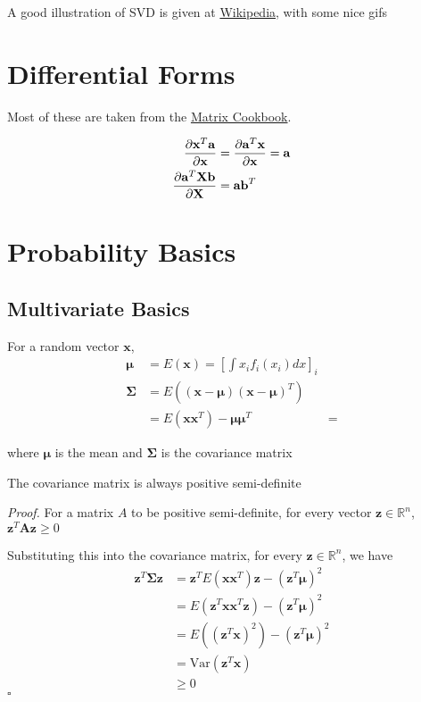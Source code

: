 \documentclass[a4paper]{article}
\newenvironment{proof}{\begin{breakbox}\textit{Proof.}}{\hfill$\square$\end{breakbox}}
\newcommand{\nl}{\vspace{0.2cm}\\}
\newcommand{\mf}{\mathbf}
\newcommand{\mb}{\mathbb}
\begin{document}
A good illustration of SVD is given at \href{https://en.wikipedia.org/wiki/Singular_value_decomposition}{Wikipedia}, with some nice gifs

\section{Differential Forms}

Most of these are taken from the \href{https://www.math.uwaterloo.ca/~hwolkowi/matrixcookbook.pdf}{Matrix Cookbook}. 

\begin{align}
  \pdv{\mf{x}^T\mf{a}}{\mf{x}} &= \pdv{\mf{a}^T\mf{x}}{\mf{x}} = \mf{a} \\
  \pdv{\mf{a}^T\mf{Xb}}{\mf{X}} &= \mf{ab}^T
\end{align}

\section{Probability Basics}

\subsection{Multivariate Basics}

For a random vector $\mf{x}$,
\begin{align}
  \bm{\mu} &= E(\bm{x}) = [\int x_i f_i(x_i) dx]_i \\
  \bm{\Sigma} &= E((\bm{x} - \bm{\mu})(\bm{x} - \bm{\mu})^T) \\
  &= E(\bm{x}\bm{x}^T) - \bm{\mu\mu}^T
  &= 
\end{align}

where $\bm{\mu}$ is the mean and $\bm{\Sigma}$ is the covariance matrix \nl

\begin{theorem}
  The covariance matrix is always positive semi-definite
\end{theorem}
\begin{proof}
  For a matrix $A$ to be positive semi-definite, for every vector $\bm{z} \in \mb{R}^n$, $\bm{z}^T\bm{Az} \ge 0$

  Substituting this into the covariance matrix, for every $\bm{z} \in \mb{R}^n$, we have
  \begin{align*}
    \bm{z}^T\bm{\Sigma z} &= \bm{z}^TE(\bm{xx}^T)\bm{z} - (\bm{z}^T\bm{\mu})^2 \\
                          &= E(\bm{z}^T\bm{xx}^T\bm{z}) - (\bm{z}^T\bm{\mu})^2 \\
                          &= E((\bm{z}^T\bm{x})^2) - (\bm{z}^T\bm{\mu})^2 \\
                          &= \mathrm{Var}(\bm{z}^T\bm{x}) \\
                          &\ge 0
  \end{align*}
\end{proof}
\end{document}
